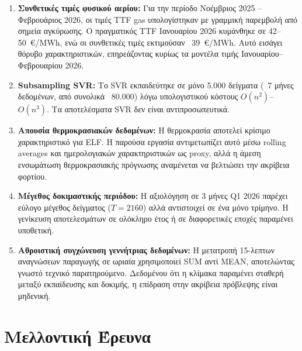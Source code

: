 \begin{enumerate}
    \item \textbf{Συνθετικές τιμές φυσικού αερίου:} Για την περίοδο Νοέμβριος
    2025 -- Φεβρουάριος 2026, οι τιμές TTF gas υπολογίστηκαν με γραμμική
    παρεμβολή από σημεία αγκύρωσης. Ο πραγματικός TTF Ιανουαρίου 2026
    κυμάνθηκε σε 42--50~€/MWh, ενώ οι συνθετικές τιμές εκτιμούσαν ~39~€/MWh.
    Αυτό εισάγει θόρυβο χαρακτηριστικών, επηρεάζοντας κυρίως τα μοντέλα
    τιμής Ιανουαρίου--Φεβρουαρίου 2026.

    \item \textbf{Subsampling SVR:} Το SVR εκπαιδεύτηκε σε μόνο 5.000 δείγματα
    (~7 μήνες δεδομένων, από συνολικά ~80.000) λόγω υπολογιστικού κόστους
    $O(n^2)$--$O(n^3)$. Τα αποτελέσματα SVR δεν είναι αντιπροσωπευτικά.

    \item \textbf{Απουσία θερμοκρασιακών δεδομένων:} Η θερμοκρασία αποτελεί
    κρίσιμο χαρακτηριστικό για ELF. Η παρούσα εργασία αντιμετωπίζει αυτό μέσω
    rolling averages και ημερολογιακών χαρακτηριστικών ως proxy, αλλά η
    άμεση ενσωμάτωση θερμοκρασιακής πρόγνωσης αναμένεται να βελτιώσει
    την ακρίβεια φορτίου.

    \item \textbf{Μέγεθος δοκιμαστικής περιόδου:} Η αξιολόγηση σε 3 μήνες
    Q1 2026 παρέχει εύλογο μέγεθος δείγματος ($T = 2160$) αλλά αντιστοιχεί
    σε ένα μόνο τρίμηνο. Η γενίκευση αποτελεσμάτων σε ολόκληρο έτος ή σε
    διαφορετικές εποχές παραμένει υποθετική.

    \item \textbf{Αθροιστική συγχώνευση γεννήτριας δεδομένων:} Η μετατροπή
    15-λεπτων αναγνώσεων παραγωγής σε ωριαία χρησιμοποιεί SUM αντί MEAN,
    αποτελώντας γνωστό τεχνικό παρατηρούμενο. Δεδομένου ότι η κλίμακα
    παραμένει σταθερή μεταξύ εκπαίδευσης και δοκιμής, η επίδραση στην
    ακρίβεια πρόβλεψης είναι μηδενική.
\end{enumerate}

\section{Μελλοντική Έρευνα}
\label{sec:conc_future}

